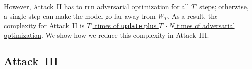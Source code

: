 \documentclass[conference]{IEEEtran}
\begin{document}
However, Attack~II has to {run\EndAccSupp{}} adversarial optimization for all $T'$ steps;
otherwise, a single step can make the model go far away from $W_T$.
As a result, the {complexity\EndAccSupp{}} for Attack~II is \ul{$T'$ times of \texttt{update} plus $T' \cdot N$ times of adversarial optimization}.
We show how we {reduce\EndAccSupp{}} this complexity in Attack~III. 



























































\subsection{Attack~III}
\end{document}
